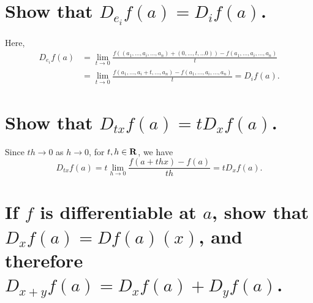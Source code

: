 
\begin{parts}
    \part{
        Show that $D_{e_i}f(a)=D_if(a)$.
    }
    \begin{solution}
        Here,
        \begin{align*}
        D_{e_i}f(a)&=\lim_{t\to 0}{
        \frac{f((a_1,...,a_i,...,a_n)+
        (0,...,t,...0))-
        f(a_1,...,a_i,...,a_n)}{t}
        }\\
        &=\lim_{t\to 0}{
        \frac{f(a_1,...,a_i+t,...,a_n)-
        f(a_1,...,a_i,...,a_n)}{t}
        }=D_if(a).
        \end{align*}
    \end{solution}
    \part{
        Show that $D_{tx}f(a)=tD_xf(a)$.
    }
    \begin{solution}
        Since $th\to 0$ as $h\to 0$,
        for $t,h\in \mathbf{R}$, we have
        $$D_{tx}f(a)=t\lim_{h\to 0}
        {\frac{f(a+thx)-f(a)}{th}}
        =tD_xf(a).$$
    \end{solution}

    \part{
        If $f$ is differentiable at $a$,
        show that $D_xf(a)=Df(a)(x)$, and
        therefore $D_{x+y}f(a)=D_xf(a)+
        D_yf(a)$.
    }
    \begin{solution}
        
    \end{solution}
\end{parts}